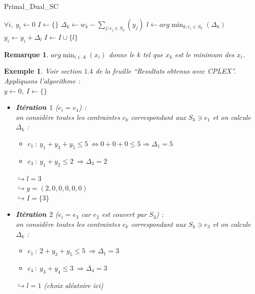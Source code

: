 \documentclass[12pt]{article}
\newtheorem{exemple}{Exemple}[section]
\newtheorem{rem}{Remarque}[section]
\begin{document}
\begin{algorithm}[h!]
\caption{Primal\_Dual\_SC}
\begin{algorithmic}[1]
\STATE $\forall i,\ y_i \leftarrow 0$
\STATE $I\leftarrow \{\}$
\STATE $\Delta_k \leftarrow w_k - \sum_{j:e_j\in S_k}(y_j)$
\ENDFOR
\STATE $l \leftarrow arg\min_{k:e_i\in S_k}(\Delta_k)$
\STATE $y_i \leftarrow y_i+\Delta_l$
\STATE $I\leftarrow I\cup \{l\}$
\ENDWHILE
\end{algorithmic}
\end{algorithm}

\begin{rem}
$arg\min_{i\in A}(x_i)$ donne le $k$ tel que $x_k$ est le minimum des $x_i$.
\end{rem}

\begin{exemple}
Voir section $1.4$ de la feuille ``Resultats obtenus avec CPLEX''. Appliquons
l'algorithme : \\
\indent $y \leftarrow 0$, $I \leftarrow \{\}$
\begin{itemize}
\item \textbf{Itération $1$} ($e_i = e_1$) :\\
on considère toutes les contraintes $c_k$ correspondant aux $S_k \ni e_1$ et on
calcule $\Delta_k$ :
	\begin{itemize}
	\item $c_1\ :\ y_1+y_3+y_5 \leq 5\ \Leftrightarrow 0+0+0\leq 5 \Rightarrow
    \Delta_1 = 5$
	\item $c_3\ :\ y_1+y_2 \leq 2\ \Rightarrow \Delta_3 = 2$
	\end{itemize}
	$\hookrightarrow l = 3$ \\
	$\hookrightarrow y = (2,0,0,0,0,0)$\\
	$\hookrightarrow I = \{3\}$\\
\item \textbf{Itération $2$} ($e_i = e_3$ car $e_2$ est couvert par $S_3$) :\\
on considère toutes les contraintes $c_k$ correspondant aux $S_k \ni e_3$ et on
calcule $\Delta_k$ :
	\begin{itemize}
	\item $c_1\ :\ 2+y_3+y_5 \leq 5\ \Rightarrow \Delta_1 = 3$
	\item $c_4\ :\ y_3+y_4 \leq 3\ \Rightarrow \Delta_4 = 3$
	\end{itemize}
	$\hookrightarrow l = 1$ (choix aléatoire ici)\\

\end{itemize}
\end{exemple}
\end{document}
